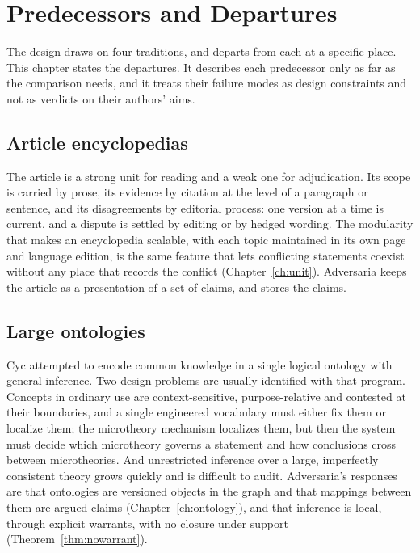 \chapter{Predecessors and Departures}\label{ch:predecessors}

The design draws on four traditions, and departs from each at a specific place. This chapter states the departures. It describes each predecessor only as far as the comparison needs, and it treats their failure modes as design constraints and not as verdicts on their authors' aims.

\section{Article encyclopedias}\label{sec:articles}

The article is a strong unit for reading and a weak one for adjudication. Its scope is carried by prose, its evidence by citation at the level of a paragraph or sentence, and its disagreements by editorial process: one version at a time is current, and a dispute is settled by editing or by hedged wording. The modularity that makes an encyclopedia scalable, with each topic maintained in its own page and language edition, is the same feature that lets conflicting statements coexist without any place that records the conflict (Chapter~\ref{ch:unit}). Adversaria keeps the article as a presentation of a set of claims, and stores the claims.

\section{Large ontologies}\label{sec:ontology}

Cyc attempted to encode common knowledge in a single logical ontology with general inference. Two design problems are usually identified with that program. Concepts in ordinary use are context-sensitive, purpose-relative and contested at their boundaries, and a single engineered vocabulary must either fix them or localize them; the microtheory mechanism localizes them, but then the system must decide which microtheory governs a statement and how conclusions cross between microtheories. And unrestricted inference over a large, imperfectly consistent theory grows quickly and is difficult to audit. Adversaria's responses are that ontologies are versioned objects in the graph and that mappings between them are argued claims (Chapter~\ref{ch:ontology}), and that inference is local, through explicit warrants, with no closure under support (Theorem~\ref{thm:nowarrant}).

